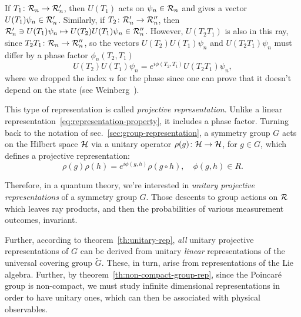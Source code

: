 If $T_1 \colon \mathcal{R}_n \to \mathcal{R}'_n$, then $U(T_1)$ acts on $\psi_n \in \mathcal{R}_n$ and gives a vector $U(T_1)\psi_n \in \mathcal{R}'_n$. Similarly, if $T_2 \colon \mathcal{R}'_n \to \mathcal{R}''_n$, then $\mathcal{R}'_n \ni U(T_1)\psi_n \mapsto U(T_2)U(T_1)\psi_n \in \mathcal{R}''_n$. However, $U(T_2 T_1)$ is also in this ray, since $T_2 T_1 \colon \mathcal{R}_n \to \mathcal{R}''_n$, so the vectors $U(T_2)U(T_1)\psi_n$ and $U(T_2T_1)\psi_n$ must differ by a phase factor $\phi_n (T_2, T_1)$
\begin{equation}
    U(T_2)U(T_1)\psi_n = e^{i\phi (T_2, T_1)} U(T_2T_1)\psi_n ,
\end{equation}
where we dropped the index $n$ for the phase since one can prove that it doesn't depend on the state (see Weinberg~\cite{weinberg}).

This type of representation is called \emph{projective representation}. Unlike a linear representation~\eqref{eq:representation-property}, it includes a phase factor. Turning back to the notation of sec.~\ref{sec:group-representation}, a symmetry group $G$ acts on the Hilbert space $\mathcal{H}$ via a unitary operator $\rho(g) \colon \mathcal{H} \to \mathcal{H}$, for $g \in G$, which defines a projective representation:
\begin{equation}
    \rho(g) \rho(h) = e^{i\phi(g,h)} \rho(g \circ h), \quad \phi(g,h) \in R.
\end{equation}

Therefore, in a quantum theory, we're interested in \emph{unitary projective representations} of a symmetry group $G$. Those descents to group actions on $\mathcal{R}$ which leaves ray products, and then the probabilities of various measurement outcomes, invariant.

Further, according to theorem~\ref{th:unitary-rep}, \emph{all} unitary projective representations of $G$ can be derived from unitary \emph{linear} representations of the universal covering group $\tilde{G}$. These, in turn, arise from representations of the Lie algebra. Further, by theorem~\ref{th:non-compact-group-rep}, since the Poincaré group is non-compact, we must study infinite dimensional representations in order to have unitary ones, which can then be associated with physical observables.